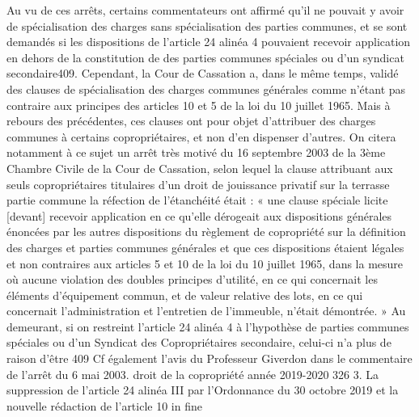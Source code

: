 		Au vu de ces arrêts, certains commentateurs ont affirmé qu’il ne pouvait y avoir de spécialisation des charges sans spécialisation des parties communes, et se sont demandés si les dispositions de l’article 24 alinéa 4 pouvaient recevoir application en dehors de la constitution de des parties communes spéciales ou d’un syndicat secondaire409.
		Cependant, la Cour de Cassation a, dans le même temps, validé des clauses de spécialisation des charges communes générales comme n’étant pas contraire aux principes des articles 10 et 5 de la loi du 10 juillet 1965. Mais à rebours des précédentes, ces clauses ont pour objet d’attribuer des charges communes à certains copropriétaires, et non d’en dispenser d’autres.
		On citera notamment à ce sujet un arrêt très motivé du 16 septembre 2003 de la 3ème Chambre Civile de la Cour de Cassation, selon lequel la clause attribuant aux seuls copropriétaires titulaires d’un droit de jouissance privatif sur la terrasse partie commune la réfection de l’étanchéité était :
		« une clause spéciale licite [devant] recevoir application en ce qu’elle dérogeait aux dispositions générales énoncées par les autres dispositions du règlement de copropriété sur la définition des charges et parties communes générales et que ces dispositions étaient légales et non contraires aux articles 5 et 10 de la loi du 10 juillet 1965, dans la mesure où aucune violation des doubles principes d’utilité, en ce qui concernait les éléments d’équipement commun, et de valeur relative des lots, en ce qui concernait l’administration et l’entretien de l’immeuble, n’était démontrée. »
		Au demeurant, si on restreint l’article 24 alinéa 4 à l’hypothèse de parties communes spéciales ou d’un Syndicat des Copropriétaires secondaire, celui-ci n’a plus de raison d’être
		409 Cf également l’avis du Professeur Giverdon dans le commentaire de l’arrêt du 6 mai 2003.
		droit de la copropriété année 2019-2020
		326
		3. La suppression de l’article 24 alinéa III par l’Ordonnance du 30 octobre 2019 et la nouvelle rédaction de l’article 10 in fine
